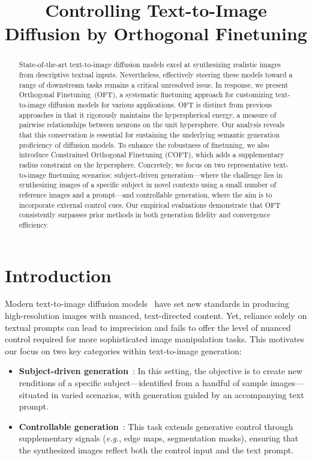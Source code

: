 \title{Controlling Text-to-Image Diffusion by Orthogonal Finetuning}

\begin{abstract}
State-of-the-art text-to-image diffusion models excel at synthesizing realistic images from descriptive textual inputs. Nevertheless, effectively steering these models toward a range of downstream tasks remains a critical unresolved issue. In response, we present Orthogonal Finetuning~(OFT), a systematic finetuning approach for customizing text-to-image diffusion models for various applications. OFT is distinct from previous approaches in that it rigorously maintains the hyperspherical energy, a measure of pairwise relationships between neurons on the unit hypersphere. Our analysis reveals that this conservation is essential for sustaining the underlying semantic generation proficiency of diffusion models. To enhance the robustness of finetuning, we also introduce Constrained Orthogonal Finetuning (COFT), which adds a supplementary radius constraint on the hypersphere. Concretely, we focus on two representative text-to-image finetuning scenarios: subject-driven generation—where the challenge lies in synthesizing images of a specific subject in novel contexts using a small number of reference images and a prompt—and controllable generation, where the aim is to incorporate external control cues. Our empirical evaluations demonstrate that OFT consistently surpasses prior methods in both generation fidelity and convergence efficiency.
\end{abstract}

\section{Introduction}

Modern text-to-image diffusion models~\cite{saharia2022photorealistic,ramesh2022hierarchical,rombach2022high} have set new standards in producing high-resolution images with nuanced, text-directed content. Yet, reliance solely on textual prompts can lead to imprecision and fails to offer the level of nuanced control required for more sophisticated image manipulation tasks. This motivates our focus on two key categories within text-to-image generation:

\begin{itemize}[leftmargin=*,nosep]

    \item \textbf{Subject-driven generation}~\cite{ruiz2023dreambooth}: In this setting, the objective is to create new renditions of a specific subject—identified from a handful of sample images—situated in varied scenarios, with generation guided by an accompanying text prompt.
    \item \textbf{Controllable generation}~\cite{zhang2023adding,mou2023t2i}: This task extends generative control through supplementary signals (\emph{e.g.}, edge maps, segmentation masks), ensuring that the synthesized images reflect both the control input and the text prompt.
\end{itemize}

